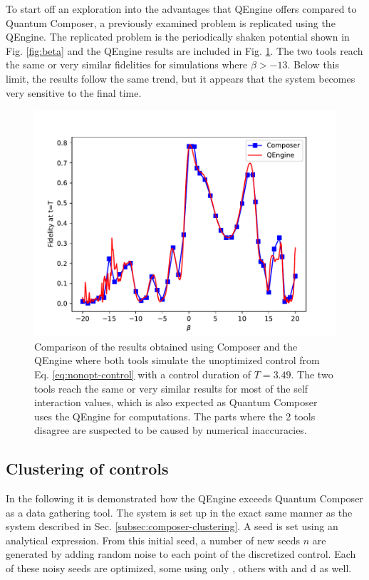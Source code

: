 \documentclass[a4paper, twocolumn]{revtex4-1}
\begin{document}
To start off an exploration into the advantages that QEngine offers compared to Quantum Composer, a previously examined problem is replicated using the QEngine. The replicated problem is the periodically shaken potential shown in Fig. \ref{fig:beta} and the QEngine results are included in Fig. \ref{fig:QEngine_nonOPt}. The two tools reach the same or very similar fidelities for simulations where $\beta > -13$. Below this limit, the results follow the same trend, but it appears that the system becomes very sensitive to the final time.
\begin{figure}
	\includegraphics[width=\columnwidth]{graphics/qengine/comparison.pdf}
	\caption{Comparison of the results obtained using Composer and the QEngine where both tools simulate the unoptimized control from Eq. \eqref{eq:nonopt-control} with a control duration of $T=3.49$. The two tools reach the same or very similar results for most of the self interaction values, which is also expected as Quantum Composer uses the QEngine for computations. The parts where the 2 tools disagree are suspected to be caused by numerical inaccuracies.}
	\label{fig:QEngine_nonOPt}
\end{figure}

\subsection{Clustering of controls}\label{subsec:qengine-clustering}
In the following it is demonstrated how the QEngine exceeds Quantum Composer as a data gathering tool. The system is set up in the exact same manner as the system described in Sec. \ref{subsec:composer-clustering}. A seed is set using an analytical expression. From this initial seed, a number of new seeds $n$ are generated by adding random noise to each point of the discretized control. Each of these noisy seeds are optimized, some using only , others with  and d as well. 
\end{document}
